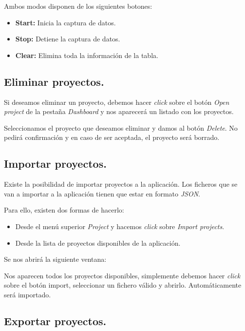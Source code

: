 Ambos modos disponen de los siguientes botones:
\begin{itemize}
\item
\textbf{Start:} Inicia la captura de datos.
\item
\textbf{Stop:} Detiene la captura de datos.
\item
\textbf{Clear:} Elimina toda la información de la tabla.
\end{itemize}

\subsection{Eliminar proyectos.}

Si deseamos eliminar un proyecto, debemos hacer \emph{click} sobre el botón \textit{Open project} de la pestaña \textit{Dashboard} y nos aparecerá un listado con los proyectos.

Seleccionamos el proyecto que deseamos eliminar y damos al botón \textit{Delete}. No pedirá confirmación y en caso de ser aceptada, el proyecto será borrado.


\subsection{Importar proyectos.}

Existe la posibilidad de importar proyectos a la aplicación. Los ficheros que se van a importar a la aplicación tienen que estar en formato \emph{JSON}.

Para ello, existen dos formas de hacerlo:

\begin{itemize}
\item
Desde el menú superior \textit{Project} y hacemos \emph{click} sobre \textit{Import projects}.
\item
Desde la lista de proyectos disponibles de la aplicación.
\end{itemize}

Se nos abrirá la siguiente ventana:


Nos aparecen todos los proyectos disponibles, simplemente debemos hacer \emph{click} sobre el botón import, seleccionar un fichero válido y abrirlo. Automáticamente será importado.

\subsection{Exportar proyectos.}

